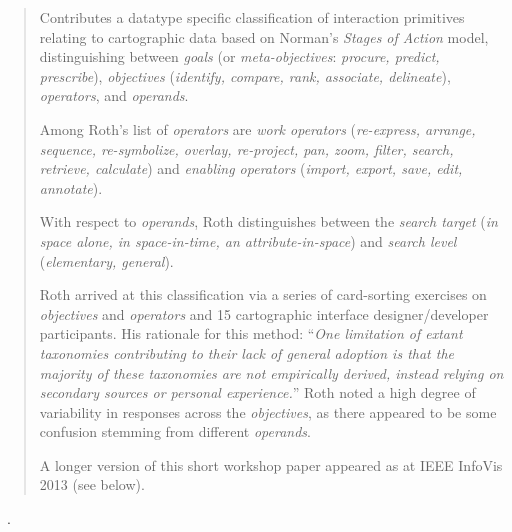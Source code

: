 \begin{quotation}
    \begin{sloppypar}
    Contributes a datatype specific classification of interaction primitives relating to cartographic data based on Norman's {\it Stages of Action} model, distinguishing between {\it goals} (or {\it meta-objectives}: {\it procure, predict, prescribe}), {\it objectives} ({\it identify, compare, rank, associate, delineate}), {\it operators}, and {\it operands}.
    \end{sloppypar}
    
    Among Roth's list of {\it operators} are {\it work operators} ({\it re-express, arrange, sequence, re-symbolize, overlay, re-project, pan, zoom, filter, search, retrieve, calculate}) and {\it enabling operators} ({\it import, export, save, edit, annotate}).
    
    With respect to {\it operands}, Roth distinguishes between the {\it search target} ({\it in space alone, in space-in-time, an attribute-in-space}) and {\it search level} ({\it elementary, general}).
    
    Roth arrived at this classification via a series of card-sorting exercises on {\it objectives} and {\it operators} and 15 cartographic interface designer/developer participants. 
    His rationale for this method: ``{\it One limitation of extant taxonomies contributing to their lack of general adoption is that the majority of these taxonomies are not empirically derived, instead relying on secondary sources or personal experience.}''
    Roth noted a high degree of variability in responses across the {\it objectives}, as there appeared to be some confusion stemming from different {\it operands}.
    
    A longer version of this short workshop paper appeared as \citet{Roth2013} at IEEE InfoVis 2013 (see below).
\end{quotation}

\begin{sloppypar}
~\cite{Pike2009}. \end{sloppypar}

